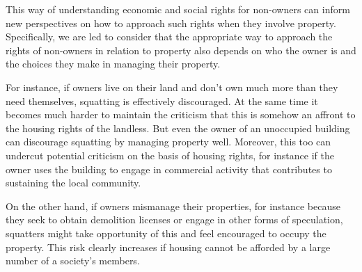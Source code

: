 This way of understanding economic and social rights for non-owners can inform new perspectives on how to approach such rights when they involve property.  Specifically, we are led to consider that the appropriate way to approach the rights of non-owners in relation to property also depends on who the owner is and the choices they make in managing their property.

For instance, if owners live on their land and don't own much more than they need themselves,  squatting is effectively discouraged. At the same time it becomes much harder to maintain the criticism that this is somehow an affront to the housing rights of the landless. But even the owner of an unoccupied building can discourage squatting by managing  property well. Moreover, this too can undercut potential criticism on the basis of housing rights, for instance if the owner uses the building to engage in commercial activity that contributes to sustaining the local community.

On the other hand, if owners mismanage their properties, for instance because they seek to obtain demolition licenses or engage in other forms of speculation, squatters might take opportunity of this and feel encouraged to occupy the property. This risk clearly increases if housing cannot be afforded by a large number of a society's members. 

